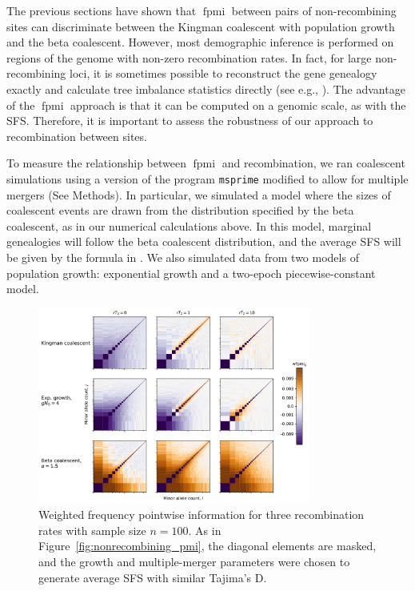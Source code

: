 \documentclass[11pt, letterpaper]{article}   	%
\newcommand{\Fig}[1]{Figure~\ref{#1}}
\DeclareMathOperator{\fpmi}{fpmi}
\begin{document}
The previous sections have shown that $\fpmi$ between pairs of non-recombining sites can discriminate between the Kingman coalescent with population growth and the beta coalescent.
However, most demographic inference is performed on regions of the genome with non-zero recombination rates.
In fact, for large non-recombining loci, it is sometimes possible to reconstruct the gene genealogy exactly and calculate tree imbalance statistics directly (see e.g., \cite{Seger2010}).
The advantage of the $\fpmi$ approach is that it can be computed on a genomic scale, as with the SFS.
Therefore, it is important to assess the robustness of our approach to recombination between sites.

To measure the relationship between $\fpmi$ and recombination, we ran coalescent simulations using a version of the program \texttt{msprime} \cite{KehellerEtAl201?} modified to allow for multiple mergers (See Methods).
In particular, we simulated a model where the sizes of coalescent events are drawn from the distribution specified by the beta coalescent, as in our numerical calculations above.
In this model, marginal genealogies will follow the beta coalescent distribution, and the average SFS will be given by the formula in \cite{BirknerEtAl2013}.
We also simulated data from two models of population growth: exponential growth and a two-epoch piecewise-constant model.

\begin{figure}
\centering
\includegraphics[width=0.8\textwidth]{figures/figure4.pdf}
\caption{Weighted frequency pointwise information for three recombination rates with sample size $n=100$. As in \Fig{fig:nonrecombining_pmi}, the diagonal elements are masked, and the growth and multiple-merger parameters were chosen to generate average SFS with similar Tajima's D. \label{fig:wpmi_recombination}}
\end{figure}
\end{document}
